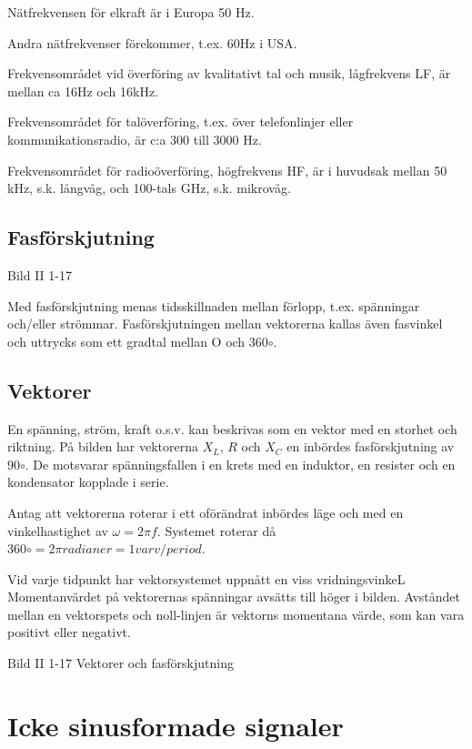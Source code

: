 Nätfrekvensen för elkraft är i Europa 50 Hz.

Andra nätfrekvenser förekommer, t.ex. 60Hz i USA.

Frekvensområdet vid överföring av kvalitativt tal och musik, lågfrekvens LF, är mellan ca 16Hz och 16kHz.

Frekvensområdet för talöverföring, t.ex. över telefonlinjer eller kommunikationsradio,
är c:a 300 till 3000 Hz.

Frekvensområdet för radioöverföring, högfrekvens HF, är i huvudsak mellan 50 kHz, s.k.
långvåg, och 100-tals GHz, s.k. mikrovåg.

\subsection{Fasförskjutning}

Bild II 1-17

Med fasförskjutning menas tidsskillnaden mellan förlopp, t.ex. spänningar och/eller
strömmar. Fasförskjutningen mellan vektorerna kallas även fasvinkel och uttrycks
som ett gradtal mellan O och 360$\circ$.

\subsection{Vektorer}

En spänning, ström, kraft o.s.v. kan beskrivas som en vektor med en storhet och riktning.
På bilden har vektorerna $X_L$, $R$ och $X_C$ en inbördes fasförskjutning av 90$\circ$.
De motsvarar spänningsfallen i en krets med en induktor, en resister och en kondensator
kopplade i serie.

Antag att vektorerna roterar i ett oförändrat inbördes läge och med en vinkelhastighet
av $\omega= 2\pi f$. Systemet roterar då $360\circ = 2\pi radianer = 1 varv/period$.

Vid varje tidpunkt har vektorsystemet uppnått en viss vridningsvinkeL Momentanvärdet på
vektorernas spänningar avsätts till höger i bilden. Avståndet mellan en vektorspets och
noll-linjen är vektorns momentana värde, som kan vara positivt eller negativt.

Bild II 1-17 Vektorer och fasförskjutning

\cleardoublepage

\section{Icke sinusformade signaler}


